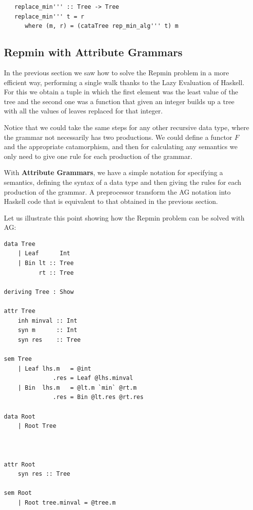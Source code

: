 \documentclass[a4paper,10pt]{article}
\begin{document}
  \begin{lstlisting}
   replace_min''' :: Tree -> Tree
   replace_min''' t = r
      where (m, r) = (cataTree rep_min_alg''' t) m
  \end{lstlisting}


\subsection{Repmin with Attribute Grammars}

In the previous section we saw how to solve the Repmin problem in a more efficient way, performing
a single walk thanks to the Lazy Evaluation of Haskell. For this we obtain a tuple in
which the first element was the least value of the tree and the second one was a function that
given an integer builds up a tree with all the values of leaves replaced for
that integer.

Notice that we could take the same steps for any other recursive data type, where the grammar
not necessarily has two productions. We could define a functor $F$ and the appropriate catamorphism,
and then for calculating any semantics we only need to give one rule for each production of the
grammar.

With \textbf{Attribute Grammars}, we have a simple notation for specifying a semantics, defining the
syntax of a data type and then giving the rules for each production of the grammar. A preprocessor
transform the AG notation into Haskell code that is equivalent to that obtained in the previous
section.

Let us illustrate this point showing how the Repmin problem can be solved with AG:

\begin{lstlisting}
data Tree
    | Leaf      Int
    | Bin lt :: Tree
	      rt :: Tree

deriving Tree : Show
	  
attr Tree
    inh minval :: Int
    syn m      :: Int
    syn res    :: Tree
      
sem Tree
    | Leaf lhs.m   = @int
              .res = Leaf @lhs.minval
	| Bin  lhs.m   = @lt.m `min` @rt.m
              .res = Bin @lt.res @rt.res

data Root
	| Root Tree
      
    

attr Root
	syn res :: Tree
      
sem Root
	| Root tree.minval = @tree.m
\end{lstlisting}
\end{document}
